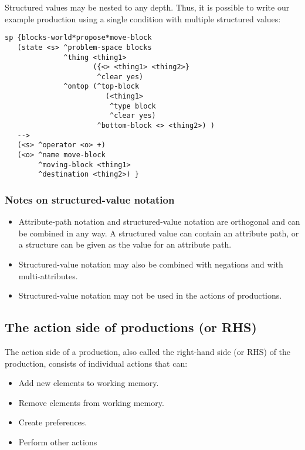 Structured values may be nested to any depth. Thus, it is possible to write
our example production using a single condition with multiple structured
values:

\begin{verbatim}
sp {blocks-world*propose*move-block
   (state <s> ^problem-space blocks
              ^thing <thing1> 
                     ({<> <thing1> <thing2>}
                      ^clear yes)
              ^ontop (^top-block 
                        (<thing1>
                         ^type block 
                         ^clear yes)
                      ^bottom-block <> <thing2>) )
   -->
   (<s> ^operator <o> +)
   (<o> ^name move-block
        ^moving-block <thing1>
        ^destination <thing2>) }
\end{verbatim}


\subsubsection*{Notes on structured-value notation}\vspace{-12pt}
\begin{itemize}
\item Attribute-path notation and structured-value notation are orthogonal and
        can be combined in any way. A structured value can contain an
        attribute path, or a structure can be given as the value for an
        attribute path. 

\item Structured-value notation may also be combined with negations and with
        multi-attributes. 

\item Structured-value notation may not be used in the actions of productions.

\end{itemize}


\subsection{The action side of productions (or RHS)}
\label{SYNTAX-pm-action}


The action side of a production, also called the right-hand side (or RHS) of
the production, consists of individual actions that can:
\begin{itemize}
\item Add new elements to working memory.
\item Remove elements from working memory.
\item Create preferences.
\item Perform other actions
\end{itemize}

